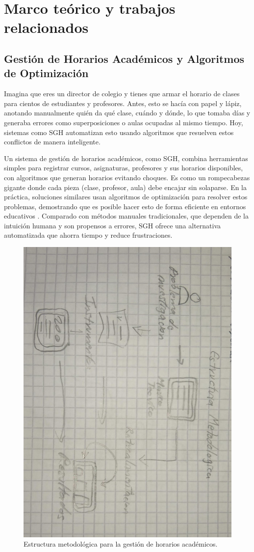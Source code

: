 \section{Marco teórico y trabajos relacionados}
\subsection{Gestión de Horarios Académicos y Algoritmos de Optimización}
Imagina que eres un director de colegio y tienes que armar el horario de clases para cientos de estudiantes y profesores. Antes, esto se hacía con papel y lápiz, anotando manualmente quién da qué clase, cuándo y dónde, lo que tomaba días y generaba errores como superposiciones o aulas ocupadas al mismo tiempo. Hoy, sistemas como SGH automatizan esto usando algoritmos que resuelven estos conflictos de manera inteligente.

Un sistema de gestión de horarios académicos, como SGH, combina herramientas simples para registrar cursos, asignaturas, profesores y sus horarios disponibles, con algoritmos que generan horarios evitando choques. Es como un rompecabezas gigante donde cada pieza (clase, profesor, aula) debe encajar sin solaparse. En la práctica, soluciones similares usan algoritmos de optimización para resolver estos problemas, demostrando que es posible hacer esto de forma eficiente en entornos educativos \cite{saltos2022}. Comparado con métodos manuales tradicionales, que dependen de la intuición humana y son propensos a errores, SGH ofrece una alternativa automatizada que ahorra tiempo y reduce frustraciones.

\begin{figure}[h]
\centering
\includegraphics[width=0.8\columnwidth]{graphics/estructura-metodologica.png}
\caption{Estructura metodológica para la gestión de horarios académicos.}
\label{fig:estructura_metodologica}
\end{figure}

